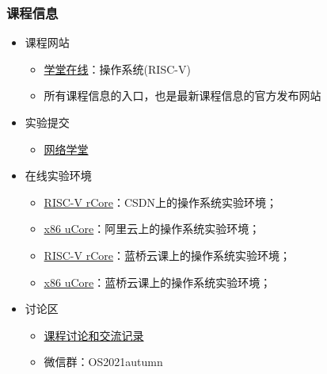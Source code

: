 \begin{frame}
    \frametitle{课程信息}
    \begin{itemize}
        \item 课程网站
        \begin{itemize}
            \item \href{https://next.xuetangx.com/}{学堂在线}：操作系统(RISC-V)
            \item 所有课程信息的入口，也是最新课程信息的官方发布网站
        \end{itemize}
        \item 实验提交
        \begin{itemize}
            \item \href{https://learn.tsinghua.edu.cn/f/wlxt/kcgg/wlkc_ggb/teacher/beforePageListJs?wlkcid=2020-2021-2142100238}{网络学堂}
        \end{itemize}
        \item 在线实验环境
        \begin{itemize}
            \item \href{https://codechina.csdn.net/courses/detail/16/l}{RISC-V rCore}：CSDN上的操作系统实验环境； 
            \item \href{https://developer.aliyun.com/adc/series/labs-tsinghua-os}{x86 uCore}：阿里云上的操作系统实验环境； 
            \item \href{https://www.lanqiao.cn/courses/1481}{RISC-V rCore}：蓝桥云课上的操作系统实验环境； 
            \item \href{https://www.lanqiao.cn/courses/221}{x86 uCore}：蓝桥云课上的操作系统实验环境；
        \end{itemize}
        \item 讨论区
        \begin{itemize}
            \item \href{https://shimo.im/docs/Q9DrJjRtVjjgrCHY}{课程讨论和交流记录}
            \item 微信群：OS2021autumn
        \end{itemize}
    \end{itemize}
\end{frame}
